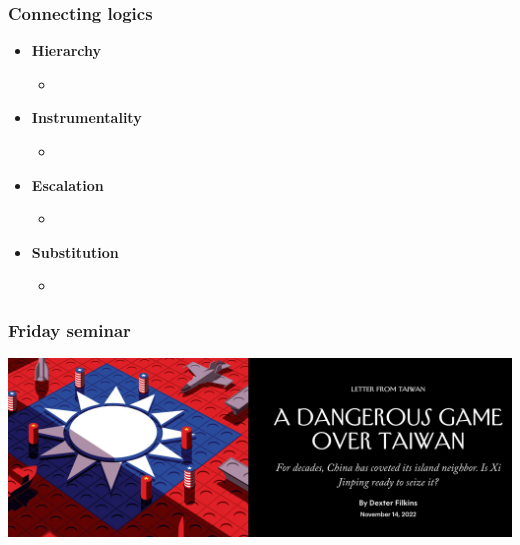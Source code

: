 \documentclass[aspectratio=43]{beamer}
\begin{document}
\begin{frame}
\frametitle{Connecting logics}
\centering

\begin{itemize}
  \item<1-> \textbf{Hierarchy}
  \begin{itemize}
    \item
  \end{itemize}
  \item<2-> \textbf{Instrumentality}
  \begin{itemize}
    \item
  \end{itemize}
  \item<3-> \textbf{Escalation}
  \begin{itemize}
    \item
  \end{itemize}
  \item<4-> \textbf{Substitution}
  \begin{itemize}
    \item
  \end{itemize}
\end{itemize}

\end{frame}

\begin{frame}
\frametitle{Friday seminar}
\centering

\includegraphics[width = \textwidth]{img/ny_taiwan}

\end{frame}
\end{document}
